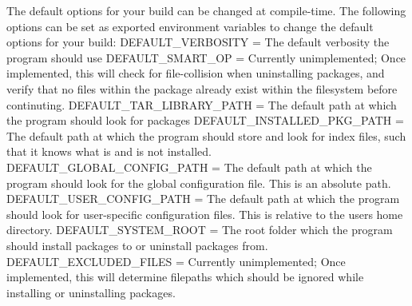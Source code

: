 The default options for your build can be changed at compile-\/time. The following options can be set as exported environment variables to change the default options for your build\+: D\+E\+F\+A\+U\+L\+T\+\_\+\+V\+E\+R\+B\+O\+S\+I\+TY = The default verbosity the program should use D\+E\+F\+A\+U\+L\+T\+\_\+\+S\+M\+A\+R\+T\+\_\+\+OP = Currently unimplemented; Once implemented, this will check for file-\/collision when uninstalling packages, and verify that no files within the package already exist within the filesystem before continuting. D\+E\+F\+A\+U\+L\+T\+\_\+\+T\+A\+R\+\_\+\+L\+I\+B\+R\+A\+R\+Y\+\_\+\+P\+A\+TH = The default path at which the program should look for packages D\+E\+F\+A\+U\+L\+T\+\_\+\+I\+N\+S\+T\+A\+L\+L\+E\+D\+\_\+\+P\+K\+G\+\_\+\+P\+A\+TH = The default path at which the program should store and look for index files, such that it knows what is and is not installed. D\+E\+F\+A\+U\+L\+T\+\_\+\+G\+L\+O\+B\+A\+L\+\_\+\+C\+O\+N\+F\+I\+G\+\_\+\+P\+A\+TH = The default path at which the program should look for the global configuration file. This is an absolute path. D\+E\+F\+A\+U\+L\+T\+\_\+\+U\+S\+E\+R\+\_\+\+C\+O\+N\+F\+I\+G\+\_\+\+P\+A\+TH = The default path at which the program should look for user-\/specific configuration files. This is relative to the user\textquotesingle{}s home directory. D\+E\+F\+A\+U\+L\+T\+\_\+\+S\+Y\+S\+T\+E\+M\+\_\+\+R\+O\+OT = The root folder which the program should install packages to or uninstall packages from. D\+E\+F\+A\+U\+L\+T\+\_\+\+E\+X\+C\+L\+U\+D\+E\+D\+\_\+\+F\+I\+L\+ES = Currently unimplemented; Once implemented, this will determine filepaths which should be ignored while installing or uninstalling packages. 